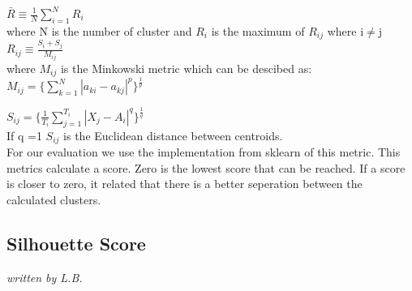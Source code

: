 $ \bar{R} \equiv \frac{1}{N} \sum_{i=1}^{N} R_i  $ \\
where N is the number of cluster and $R_i$ is the maximum of $R_{ij}$ where i$\neq$j \\
	
$R_{ij} \equiv \frac{S_i+ S_j}{M_{ij}}$ \\
where $M_{ij}$ is the Minkowski metric which can be descibed as: \\ $M_{ij} = \{ \sum_{k=1}^{N} |a_{ki} - a_{kj}  |^p    \} ^{  \frac{1}{p}}   $ 	
	
$S_{ij} = \{\frac{1}{T_i} \sum_{j=1}^{T_i} |X_{j} - A_{i}  |^q    \}^\frac{1}{q}$ \\
	
If q =1 	$S_{ij}$ is the Euclidean distance between centroids.  \\
  
For our evaluation we use the implementation from sklearn of this metric. This metrics calculate a score. Zero is the lowest score that can be reached. If a score is closer to zero, it related that there is a better seperation between the calculated clusters. 

\subsection{Silhouette Score}
\label{Silhouette Score}
\textit{written by L.B.}\\

